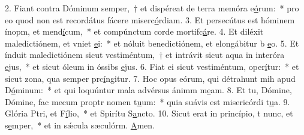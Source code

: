 2. Fiant contra Dóminum semper,~† et dispéreat de terra memóra e\uline{ó}rum:~* pro eo quod non est recordátus fácere miserc\uline{ó}rdiam.
3. Et persecútus est hóminem ínopm, et mend\uline{í}cum,~* et compúnctum corde mortifc\uline{á}re.
4. Et diléxit maledictiónem, et vniet \uline{e}i:~* et nóluit benedictiónem, et elongábitur b \uline{e}o.
5. Et índuit maledictiónem sicut vestiméntum,~† et intrávit sicut aqua in interóra \uline{e}jus,~* et sicut óleum in óssibs \uline{e}jus.
6. Fiat ei sicut vestiméntum,  oper\uline{í}tur:~* et sicut zona, qua semper prc\uline{í}ngitur.
7. Hoc opus eórum, qui détrahunt mih apud D\uline{ó}minum:~* et qui loquúntur mala advérsus ánimm m\uline{e}am.
8. Et tu, Dómine, Dómine, fac mecum proptr nomen t\uline{u}um:~* quia suávis est misericórdi t\uline{u}a.
9. Glória Ptri, et F\uline{í}lio,~* et Spirítu S\uline{a}ncto.
10. Sicut erat in princípio, t nunc, et s\uline{e}mper,~* et in sǽcula sæculórm. \uline{A}men.
